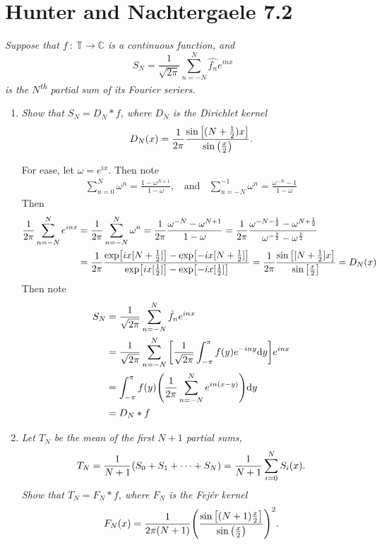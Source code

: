 \documentclass[paper=a4, fontsize=11pt]{scrartcl} %
\theoremstyle{plain}
\numberwithin{equation}{section} %
\numberwithin{figure}{section} %
\numberwithin{table}{section} %
\begin{document}
\section{Hunter and Nachtergaele 7.2}
\emph{Suppose that $f\ :\ \mathbb{T} \rightarrow \mathbb{C}$ is a continuous function, and $$S_N = \frac{1}{\sqrt{2\pi}}\sum_{n=-N}^N \hat{f_n}e^{inx}$$ is the $N$\textsuperscript{th} partial sum of its Fourier seriers.}
\begin{enumerate}[\bf (a)]
    \item
        \emph{Show that $S_N = D_N * f$, where $D_N$ is the \emph{Dirichlet kernel} $$D_N(x) = \frac{1}{2\pi}\frac{\sin\qty[(N+\frac{1}{2})x]}{\sin \qty(\frac{x}{2})}.$$}

        For ease, let $\omega = e^{ix}$.  Then note
        \begin{align*}
            \sum_{n=0}^N \omega^n = \frac{1 - \omega^{N+1}}{1 - \omega},\ \ \ \ \text{and}\ \ \ \ \sum_{n=-N}^{-1}\omega^n = \frac{\omega^{-N} - 1}{1 - \omega}
        \end{align*}
        Then
        \begin{align*}
            \frac{1}{2\pi}\sum_{n=-N}^N e^{inx} &= \frac{1}{2\pi}\sum_{n=-N}^N \omega^n = \frac{1}{2\pi}\frac{\omega^{-N} - \omega^{N+1}}{1 - \omega} = \frac{1}{2\pi}\frac{\omega^{-N - \frac{1}{2}} - \omega^{N + \frac{1}{2}}}{\omega^{-\frac{1}{2}} - \omega^{\frac{1}{2}}} \\
            &= \frac{1}{2\pi}\frac{\exp[ix[N + \frac{1}{2}]] - \exp[-ix[N+\frac{1}{2}]]}{\exp[ix[\frac{1}{2}]] - \exp[-ix[\frac{1}{2}]]} = \frac{1}{2\pi}\frac{\sin\qty[[N+\frac{1}{2}]x]}{\sin\qty[\frac{x}{2}]} = D_N(x)
        \end{align*}
        Then note
        \begin{align*}
            S_N &= \frac{1}{\sqrt{2\pi}}\sum_{n=-N}^N\hat{f}_n e^{inx} \\
            &= \frac{1}{\sqrt{2\pi}}\sum_{n=-N}^N\qty[\frac{1}{\sqrt{2\pi}}\int_{-\pi}^\pi f(y)e^{-iny}\dd y]e^{inx} \\
            &= \int_{-\pi}^\pi f(y)\qty(\frac{1}{2\pi}\sum_{n=-N}^N e^{in(x-y)})\dd y \\
            &= D_N * f
        \end{align*}
    \item
        \emph{Let $T_N$ be the mean of the first $N+1$ partial sums, $$T_N = \frac{1}{N+1}\qty(S_0 + S_1 + \dots + S_N) = \frac{1}{N+1}\sum_{i=0}^N S_i(x).$$  Show that $T_N = F_N * f$, where $F_N$ is the \emph{Fej\'{e}r kernel} $$F_N(x) = \frac{1}{2\pi(N + 1)}\qty(\frac{\sin\qty[(N + 1)\frac{x}{2}]}{\sin\qty(\frac{x}{2})})^2.$$}


\end{enumerate}
\end{document}
